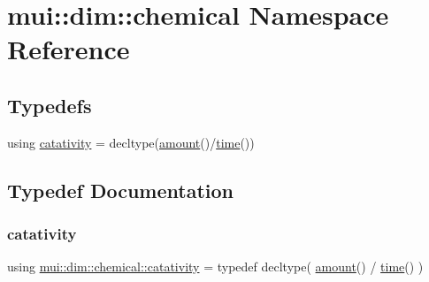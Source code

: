 \hypertarget{namespacemui_1_1dim_1_1chemical}{}\section{mui\+:\+:dim\+:\+:chemical Namespace Reference}
\label{namespacemui_1_1dim_1_1chemical}
\subsection*{Typedefs}
\begin{DoxyCompactItemize}
\item 
using \hyperlink{namespacemui_1_1dim_1_1chemical_a14192d001c48dd9f7564375d5946e9e0}{catativity} = decltype(\hyperlink{namespacemui_1_1dim_a00ff3f13d3bd0f4564227904373dc3eb}{amount}()/\hyperlink{namespacemui_1_1dim_a3d3a0014025f1c2c0dd7418791928500}{time}())
\end{DoxyCompactItemize}


\subsection{Typedef Documentation}
\mbox{\label{namespacemui_1_1dim_1_1chemical_a14192d001c48dd9f7564375d5946e9e0}} 
\subsubsection{\texorpdfstring{catativity}{catativity}}
{\footnotesize\ttfamily using \hyperlink{namespacemui_1_1dim_1_1chemical_a14192d001c48dd9f7564375d5946e9e0}{mui\+::dim\+::chemical\+::catativity} = typedef decltype( \hyperlink{namespacemui_1_1dim_a00ff3f13d3bd0f4564227904373dc3eb}{amount}() / \hyperlink{namespacemui_1_1dim_a3d3a0014025f1c2c0dd7418791928500}{time}() )}

